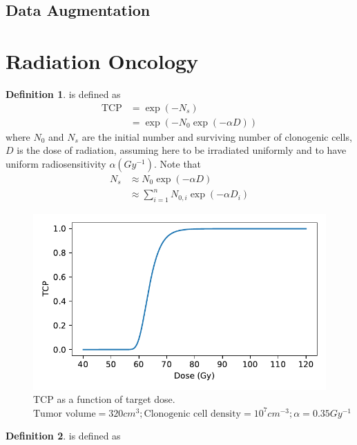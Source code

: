 \documentclass[a4paper]{article}
\theoremstyle{definition}
\newtheorem{definition}{Definition}
\theoremstyle{plain}
\begin{document}
\subsection{Data Augmentation}

\newpage
\section{Radiation Oncology}
\begin{definition}
 is defined as
\begin{align*}
    \operatorname{TCP}&=\exp(-N_s)\\
    &=\exp(-N_0\exp(-\alpha D))
\end{align*}
where $N_0$ and $N_s$ are the initial number and surviving number of clonogenic cells, $D$ is the dose of radiation, assuming here to be irradiated uniformly and to have uniform radiosensitivity $\alpha(Gy^{-1})$. Note that
\begin{align*}
    N_s&\approx N_0\exp(-\alpha D)\\
    &\approx \sum^n_{i=1}N_{0,i}\exp(-\alpha D_i)
\end{align*}
\end{definition}

\begin{figure}[H]
    \centering
    \includegraphics[scale=0.7]{figure/tcp.pdf}
    \caption{TCP as a function of target dose. $\text{Tumor volume}=320 cm^3; \text{Clonogenic cell density}=10^7cm^{-3}; \alpha=0.35Gy^{-1}$}
\end{figure}

\begin{definition}
 is defined as

\end{definition}
\end{document}
